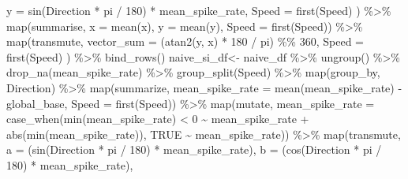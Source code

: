 \documentclass[
]{book}
\newenvironment{Shaded}{\begin{snugshade}}{\end{snugshade}}
\newcommand{\AttributeTok}[1]{\textcolor[rgb]{0.77,0.63,0.00}{#1}}
\newcommand{\ConstantTok}[1]{\textcolor[rgb]{0.00,0.00,0.00}{#1}}
\newcommand{\DecValTok}[1]{\textcolor[rgb]{0.00,0.00,0.81}{#1}}
\newcommand{\FunctionTok}[1]{\textcolor[rgb]{0.00,0.00,0.00}{#1}}
\newcommand{\NormalTok}[1]{#1}
\newcommand{\OtherTok}[1]{\textcolor[rgb]{0.56,0.35,0.01}{#1}}
\newcommand{\SpecialCharTok}[1]{\textcolor[rgb]{0.00,0.00,0.00}{#1}}
\begin{document}
\begin{Shaded}
\begin{Highlighting}[]
      \AttributeTok{y =} \FunctionTok{sin}\NormalTok{(Direction }\SpecialCharTok{*}\NormalTok{ pi }\SpecialCharTok{/} \DecValTok{180}\NormalTok{) }\SpecialCharTok{*}\NormalTok{ mean\_spike\_rate,}
      \AttributeTok{Speed =} \FunctionTok{first}\NormalTok{(Speed)}
\NormalTok{  ) }\SpecialCharTok{\%\textgreater{}\%}
  \FunctionTok{map}\NormalTok{(summarise,}
      \AttributeTok{x =} \FunctionTok{mean}\NormalTok{(x),}
      \AttributeTok{y =} \FunctionTok{mean}\NormalTok{(y),}
      \AttributeTok{Speed =} \FunctionTok{first}\NormalTok{(Speed)) }\SpecialCharTok{\%\textgreater{}\%}
  \FunctionTok{map}\NormalTok{(transmute,}
      \AttributeTok{vector\_sum =}\NormalTok{ (}\FunctionTok{atan2}\NormalTok{(y, x) }\SpecialCharTok{*} \DecValTok{180} \SpecialCharTok{/}\NormalTok{ pi) }\SpecialCharTok{\%\%} \DecValTok{360}\NormalTok{,}
      \AttributeTok{Speed =} \FunctionTok{first}\NormalTok{(Speed)}
\NormalTok{  ) }\SpecialCharTok{\%\textgreater{}\%}
  \FunctionTok{bind\_rows}\NormalTok{()}
\NormalTok{naive\_si\_df}\OtherTok{\textless{}{-}}
\NormalTok{  naive\_df }\SpecialCharTok{\%\textgreater{}\%}
  \FunctionTok{ungroup}\NormalTok{() }\SpecialCharTok{\%\textgreater{}\%}
  \FunctionTok{drop\_na}\NormalTok{(mean\_spike\_rate) }\SpecialCharTok{\%\textgreater{}\%}
  \FunctionTok{group\_split}\NormalTok{(Speed) }\SpecialCharTok{\%\textgreater{}\%}
  \FunctionTok{map}\NormalTok{(group\_by, Direction) }\SpecialCharTok{\%\textgreater{}\%}
  \FunctionTok{map}\NormalTok{(summarize,}
      \AttributeTok{mean\_spike\_rate =} \FunctionTok{mean}\NormalTok{(mean\_spike\_rate) }\SpecialCharTok{{-}}\NormalTok{ global\_base,}
      \AttributeTok{Speed =} \FunctionTok{first}\NormalTok{(Speed)) }\SpecialCharTok{\%\textgreater{}\%}
  \FunctionTok{map}\NormalTok{(mutate,}
      \AttributeTok{mean\_spike\_rate =}
        \FunctionTok{case\_when}\NormalTok{(}\FunctionTok{min}\NormalTok{(mean\_spike\_rate) }\SpecialCharTok{\textless{}} \DecValTok{0} \SpecialCharTok{\textasciitilde{}}\NormalTok{ mean\_spike\_rate }\SpecialCharTok{+} \FunctionTok{abs}\NormalTok{(}\FunctionTok{min}\NormalTok{(mean\_spike\_rate)),}
                  \ConstantTok{TRUE} \SpecialCharTok{\textasciitilde{}}\NormalTok{ mean\_spike\_rate)) }\SpecialCharTok{\%\textgreater{}\%}
  \FunctionTok{map}\NormalTok{(transmute,}
      \AttributeTok{a =}\NormalTok{ (}\FunctionTok{sin}\NormalTok{(Direction }\SpecialCharTok{*}\NormalTok{ pi }\SpecialCharTok{/} \DecValTok{180}\NormalTok{) }\SpecialCharTok{*}\NormalTok{ mean\_spike\_rate),}
      \AttributeTok{b =}\NormalTok{ (}\FunctionTok{cos}\NormalTok{(Direction }\SpecialCharTok{*}\NormalTok{ pi }\SpecialCharTok{/} \DecValTok{180}\NormalTok{) }\SpecialCharTok{*}\NormalTok{ mean\_spike\_rate),}

\end{Highlighting}
\end{Shaded}
\end{document}

